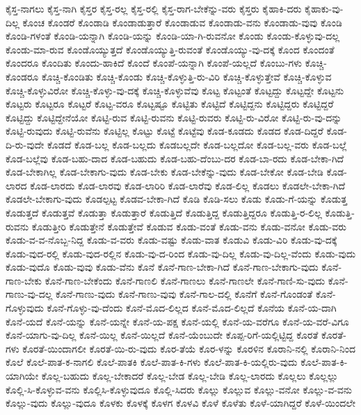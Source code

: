 {ಕೈಸ್ತ-ನಾಗಲು
ಕೈಸ್ತ-ನಾಗಿ
ಕೈಸ್ತರ
ಕೈಸ್ತ-ರಲ್ಲ
ಕೈಸ್ತ-ರಲ್ಲಿ
ಕೈಸ್ತ-ರಾಗ-ಬೇಕೆನ್ನು-ವರು
ಕೈಸ್ತರು
ಕೈಹಾಕಿ-ದರು
ಕೈಹಾಕು-ವು-ದಿಲ್ಲ
ಕೊಂಚ
ಕೊಂಡರೆ
ಕೊಂಡಾಡಿ
ಕೊಂಡಾಡುತ್ತಾರೆ
ಕೊಂಡಾಡುವ
ಕೊಂಡಾಡು-ವನು
ಕೊಂಡಾಡು-ವುವು
ಕೊಂಡಿ
ಕೊಂಡಿ-ಗಳಂತೆ
ಕೊಂಡಿ-ಯನ್ನಾಗಿ
ಕೊಂಡಿ-ಯನ್ನು
ಕೊಂಡಿ-ಯಾ-ಗಿ-ರುವನೋ
ಕೊಂಡು
ಕೊಂಡು-ಕೊಳ್ಳುವು-ದಲ್ಲ
ಕೊಂಡು-ಮಾ-ರುವ
ಕೊಂಡೊಯ್ಯುತ್ತದೆ
ಕೊಂಡೊಯ್ಯುತ್ತಿ-ರುವಂತೆ
ಕೊಂಡೊಯ್ಯು-ವು-ದಕ್ಕೆ
ಕೊಂದ
ಕೊಂದಂತೆ
ಕೊಂದರೂ
ಕೊಂದಿತು
ಕೊಂದು-ಹಾಕಿದೆ
ಕೊಂದೆ
ಕೊಂಪೆ-ಯನ್ನಾಗಿ
ಕೊಂಪೆ-ಯಲ್ಲದೆ
ಕೊಂಬು-ಗಳು
ಕೊಚ್ಚಿ-ಕೊಂಡರೂ
ಕೊಚ್ಚಿ-ಕೊಂಡಿತು
ಕೊಚ್ಚಿ-ಕೊಂಡು
ಕೊಚ್ಚಿ-ಕೊಳ್ಳುತ್ತಿ-ರು-ವಿರಿ
ಕೊಚ್ಚಿ-ಕೊಳ್ಳುತ್ತೇವೆ
ಕೊಚ್ಚಿ-ಕೊಳ್ಳುವ
ಕೊಚ್ಚಿ-ಕೊಳ್ಳುವಿರೋ
ಕೊಚ್ಚಿ-ಕೊಳ್ಳು-ವು-ದಕ್ಕೆ
ಕೊಚ್ಚಿ-ಕೊಳ್ಳುವೆವು
ಕೊಟ್ಟ
ಕೊಟ್ಟಂತೆ
ಕೊಟ್ಟದ್ದು
ಕೊಟ್ಟದ್ದೇ
ಕೊಟ್ಟನು
ಕೊಟ್ಟರು
ಕೊಟ್ಟರೂ
ಕೊಟ್ಟರೆ
ಕೊಟ್ಟ-ವರೂ
ಕೊಟ್ಟಷ್ಟೂ
ಕೊಟ್ಟಿತು
ಕೊಟ್ಟಿದೆ
ಕೊಟ್ಟಿದ್ದನು
ಕೊಟ್ಟಿದ್ದರು
ಕೊಟ್ಟಿದ್ದರೆ
ಕೊಟ್ಟಿದ್ದು
ಕೊಟ್ಟಿದ್ದೇನೆಯೋ
ಕೊಟ್ಟಿ-ರುವ
ಕೊಟ್ಟಿ-ರುವನು
ಕೊಟ್ಟಿ-ರುವರು
ಕೊಟ್ಟಿ-ರು-ವಿರೋ
ಕೊಟ್ಟಿ-ರು-ವು-ದನ್ನು
ಕೊಟ್ಟಿ-ರುವುದು
ಕೊಟ್ಟಿ-ರುವೆನು
ಕೊಟ್ಟಿಲ್ಲ
ಕೊಟ್ಟು
ಕೊಟ್ಟೆ
ಕೊಟ್ಟೆವು
ಕೊಡ-ಕೂಡದು
ಕೊಡದ
ಕೊಡ-ದಿದ್ದರೆ
ಕೊಡ-ದಿ-ರು-ವುದೇ
ಕೊಡದೆ
ಕೊಡ-ಬಲ್ಲ
ಕೊಡ-ಬಲ್ಲದು
ಕೊಡಬಲ್ಲದೇ
ಕೊಡ-ಬಲ್ಲದೋ
ಕೊಡ-ಬಲ್ಲ-ವರು
ಕೊಡ-ಬಲ್ಲೆ
ಕೊಡ-ಬಲ್ಲೆವು
ಕೊಡ-ಬಹು-ದಾದ
ಕೊಡ-ಬಹುದು
ಕೊಡ-ಬಹು-ದೆಂಬು-ದರ
ಕೊಡ-ಬಾ-ರದು
ಕೊಡ-ಬೇಕಾ-ಗಿದೆ
ಕೊಡ-ಬೇಕಾಗಿಲ್ಲ
ಕೊಡ-ಬೇಕಾಗು-ವುದು
ಕೊಡ-ಬೇಕು
ಕೊಡ-ಬೇಕೆನ್ನು-ವುದು
ಕೊಡ-ಬೇಕೋ
ಕೊಡ-ಬೇಡಿ
ಕೊಡ-ಲಾರದ
ಕೊಡ-ಲಾರದು
ಕೊಡ-ಲಾರವು
ಕೊಡ-ಲಾರಿರಿ
ಕೊಡ-ಲಾರೆವು
ಕೊಡ-ಲಿಲ್ಲ
ಕೊಡಲು
ಕೊಡಲೇ-ಬೇಕಾ-ಗಿದೆ
ಕೊಡಲೇ-ಬೇಕಾಗು-ವುದು
ಕೊಡಲ್ಪಟ್ಟ
ಕೊಡವ-ಬೇಕಾ-ಗಿದೆ
ಕೊಡಿ
ಕೊಡಿ-ಸಲು
ಕೊಡು
ಕೊಡು-ಗೆ-ಯನ್ನು
ಕೊಡುತ್ತ
ಕೊಡುತ್ತದೆ
ಕೊಡುತ್ತವೆ
ಕೊಡುತ್ತಾ
ಕೊಡುತ್ತಾರೆ
ಕೊಡುತ್ತಿದೆ
ಕೊಡುತ್ತಿದ್ದ
ಕೊಡುತ್ತಿದ್ದರೂ
ಕೊಡುತ್ತಿ-ರ-ಲಿಲ್ಲ
ಕೊಡುತ್ತಿ-ರುವನು
ಕೊಡುತ್ತೀರಿ
ಕೊಡುತ್ತೇನೆ
ಕೊಡುತ್ತೇವೆ
ಕೊಡುವ
ಕೊಡು-ವಂತೆ
ಕೊಡು-ವನು
ಕೊಡು-ವನೋ
ಕೊಡು-ವರು
ಕೊಡು-ವ-ವ-ನೊಬ್ಬ-ನಿದ್ದ
ಕೊಡು-ವ-ವರು
ಕೊಡು-ವಷ್ಟು
ಕೊಡು-ವಾತ
ಕೊಡುವಿ
ಕೊಡು-ವಿರಿ
ಕೊಡು-ವು-ದಕ್ಕೆ
ಕೊಡು-ವುದ-ರಲ್ಲಿ
ಕೊಡು-ವುದ-ರಲ್ಲಿನ
ಕೊಡು-ವು-ದ-ರಿಂದ
ಕೊಡು-ವು-ದಿಲ್ಲ
ಕೊಡು-ವು-ದಿಲ್ಲ-ವೆಂದು
ಕೊಡು-ವುದು
ಕೊಡು-ವುದೊ
ಕೊಡು-ವುವು
ಕೊಡು-ವೆನು
ಕೊನೆ
ಕೊನೆ-ಗಾಣ-ಬೇಕಾ-ಗಿದೆ
ಕೊನೆ-ಗಾಣ-ಬೇಕಾಗು-ವುದು
ಕೊನೆ-ಗಾಣ-ಬೇಕು
ಕೊನೆ-ಗಾಣ-ಬೇಕೆಂದು
ಕೊನೆ-ಗಾಣಲಿ
ಕೊನೆ-ಗಾಣಲು
ಕೊನೆ-ಗಾಣಲೇ
ಕೊನೆ-ಗಾಣಿ-ಸು-ವುದು
ಕೊನೆ-ಗಾಣು-ವು-ದಲ್ಲ
ಕೊನೆ-ಗಾಣು-ವುದು
ಕೊನೆ-ಗಾಣು-ವುವು
ಕೊನೆ-ಗಾಲ-ದಲ್ಲಿ
ಕೊನೆಗೆ
ಕೊನೆ-ಗೊಂಡಂತೆ
ಕೊನೆ-ಗೊಳ್ಳುವುದು
ಕೊನೆ-ಗೊಳ್ಳು-ವು-ದೆಂದು
ಕೊನೆ-ಮೊದ-ಲಿಲ್ಲದ
ಕೊನೆ-ಮೊದ-ಲಿಲ್ಲದೆ
ಕೊನೆಯ
ಕೊನೆ-ಯ-ದಾಗಿ
ಕೊನೆ-ಯದೆ
ಕೊನೆ-ಯನ್ನು
ಕೊನೆ-ಯನ್ನೇ
ಕೊನೆ-ಯ-ಪಕ್ಷ
ಕೊನೆ-ಯಲ್ಲಿ
ಕೊನೆ-ಯ-ವರೆಗೂ
ಕೊನೆ-ಯ-ವರೆ-ವಿಗೂ
ಕೊನೆ-ಯಾಗು-ವು-ದಿಲ್ಲ
ಕೊನೆ-ಯಿಲ್ಲ
ಕೊನೆ-ಯಿಲ್ಲದೆ
ಕೊನೆ-ಯೆಂಬುದೇ
ಕೊಪ್ಪ-ರಿಗೆ-ಯಲ್ಲಿಟ್ಟಿದ್ದ
ಕೊರತೆ
ಕೊರತೆ-ಗಳು
ಕೊರತೆ-ಯಿಂದಾಗಲೀ
ಕೊರತೆ-ಯಿ-ರು-ವುದು
ಕೊರ-ತೆಯೆ
ಕೊರ-ಳನ್ನು
ಕೊರಳಿನ
ಕೊರಾನಿ-ನಲ್ಲಿ
ಕೊರಾನಿ-ನಿಂದ
ಕೊಲೆ
ಕೊಲೆ-ಪಾತ-ಕ-ನಾಗಲಿ
ಕೊಲೆ-ಪಾತಕಿ
ಕೊಲೆ-ಪಾತ-ಕಿ-ಗಳು
ಕೊಲೆ-ಪಾತ-ಕಿ-ಯಲ್ಲಿರು-ವುದು
ಕೊಲೆ-ಪಾತ-ಕಿ-ಯಾಗಿಯೇ
ಕೊಲ್ಲ-ಬಹುದು
ಕೊಲ್ಲ-ಬೇಕಾದರೆ
ಕೊಲ್ಲ-ಬೇಡ
ಕೊಲ್ಲ-ಬೇಡಿ
ಕೊಲ್ಲ-ಲಾರದು
ಕೊಲ್ಲಲು
ಕೊಲ್ಲಲ್ಲು
ಕೊಲ್ಲಿ-ಸಿ-ಕೊಳ್ಳುವ-ವನು
ಕೊಲ್ಲಿಸಿ-ಕೊಳ್ಳುವುದೂ
ಕೊಲ್ಲಿ-ಸಿದರು
ಕೊಲ್ಲು
ಕೊಲ್ಲುವ
ಕೊಲ್ಲು-ವನೋ
ಕೊಲ್ಲು-ವ-ವನು
ಕೊಲ್ಲು-ವುದು
ಕೊಲ್ಲು-ವುದೂ
ಕೊಳಕು
ಕೊಳಕ್ಕೆ
ಕೊಳಗ
ಕೊಳವಿ
ಕೊಳೆ
ಕೊಳೆತು
ಕೊಳೆ-ಯಾಗಿದ್ದರೆ
ಕೊಳೆ-ಯಿಂದಲೇ
}
